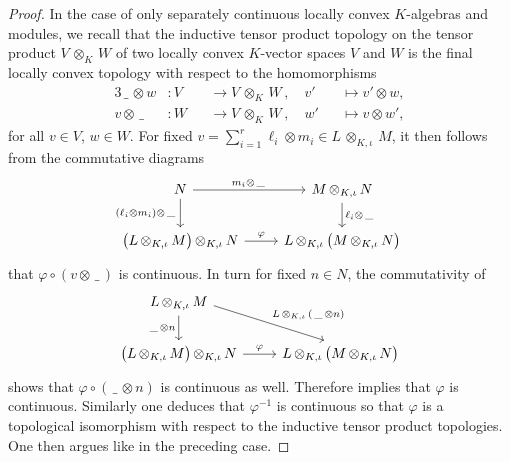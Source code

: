 \documentclass[a4paper, reqno, 10pt]{amsart}
\theoremstyle{definition}
\numberwithin{equation}{section}
\newcommand{\blank}{{\,\_\,}}
\newcommand{\botimes}[1]{{\,\otimes_{#1}\,}}
\newcommand{\indotimes}{{\,\otimes_{K,\iota}\,}}
\newcommand{\lra}{\longrightarrow}
\newcommand{\lto}{\longmapsto}
\begin{document}
\begin{proof}
	
	In the case of only separately continuous locally convex $K$-algebras and modules, we recall that the inductive tensor product topology on the tensor product $V \botimes{K} W$ of two locally convex $K$-vector spaces $V$ and $W$ is the final locally convex topology with respect to the homomorphisms
	\begin{alignat*}{3}
		\blank \otimes w  &\colon V &&\lra V \botimes{K} W \,,\quad  v' &&\lto v' \otimes w , \\
		v \otimes \blank &\colon W &&\lra V \botimes{K} W \,,\quad w' &&\lto v \otimes w' ,
	\end{alignat*}
	for all $v \in V$, $w\in W$.
	For fixed $v = \sum_{i=1}^r \ell_i \otimes m_i \in L \indotimes M$, it then follows from the commutative diagrams
	\begin{equation*}
		\begin{tikzcd}
			N \ar[r, "m_i \otimes \blank"] \ar[d, "(\ell_i \otimes m_i ) \otimes \blank"'] & M \indotimes N \ar[d, "\ell_i \otimes \blank"] \\
			\big( L \indotimes M \big) \indotimes N \ar[r, "\varphi"] & L \indotimes \big( M \indotimes N \big)
		\end{tikzcd}
	\end{equation*}
	that $\varphi \circ  ( v \otimes \blank ) $ is continuous.
	In turn for fixed $n\in N$, the commutativity of 
	\begin{equation*}
		\begin{tikzcd}
			L \indotimes M \ar[rd, "L \indotimes (\blank \otimes n)", start anchor = 355, end anchor = 140] \ar[d, "\blank \otimes n"'] & \\
			\big( L \indotimes M \big) \indotimes N \ar[r, "\varphi"] & L \indotimes \big( M \indotimes N \big)
		\end{tikzcd}
	\end{equation*}
	shows that $\varphi \circ ( \blank \otimes n )$ is continuous as well.
	Therefore \cite[Lemma 5.1 (i)]{Schneider02NonArchFunctAna} implies that $\varphi$ is continuous.
	Similarly one deduces that $\varphi^{-1}$ is continuous so that $\varphi$ is a topological isomorphism with respect to the inductive tensor product topologies.
	One then argues like in the preceding case.
\end{proof}


	
\end{document}
